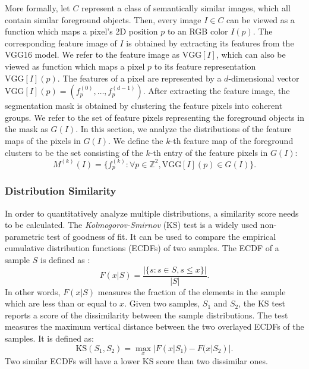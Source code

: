 More formally, let $C$ represent a class of semantically similar images, which all contain similar foreground objects. Then, every image $I \in C$ can be viewed as a function which maps a pixel's 2D position $p$ to an RGB color $I(p)$. The corresponding feature image of $I$ is obtained by extracting its features from the VGG16 model. We refer to the feature image as $\text{VGG}[I]$, which can also be viewed as function which maps a pixel $p$ to its feature representation $\text{VGG}[I](p)$. The features of a pixel are represented by a $d$-dimensional vector $\text{VGG}[I](p)=(f_p^{(0)}, \ldots, f_p^{(d-1)})$. After extracting the feature image, the segmentation mask is obtained by clustering the feature pixels into coherent groups. We refer to the set of feature pixels representing the foreground objects in the mask as $G(I)$. In this section, we analyze the distributions of the feature maps of the pixels in $G(I)$. We define the $k$-th feature map of the foreground clusters to be the set consisting of the $k$-th entry of the feature pixels in $G(I)$:
\begin{equation}
    M^{(k)}\!(I) = \{f_p^{(k)} : \forall p \in \mathbb{Z}^2, \text{VGG}[I](p) \in G(I) \}.
\end{equation}

\subsubsection{Distribution Similarity}

In order to quantitatively analyze multiple distributions, a similarity score needs to be calculated. The \emph{Kolmogorov-Smirnov} (KS) test \parencite{massey1951kolmogorov} is a widely used non-parametric test of goodness of fit. It can be used to compare the empirical cumulative distribution functions (ECDFs) of two samples. The ECDF of a sample $S$ is defined as \parencite{massey1951kolmogorov}:
\begin{equation}
    F(x | S) = \frac{|\{s: s \in S, s \le x\}|}{|S|}.
\end{equation}
In other words, $F(x | S)$ measures the fraction of the elements in the sample which are less than or equal to $x$.
Given two samples, $S_1$ and $S_2$, the KS test reports a score of the dissimilarity between the sample distributions. The test measures the maximum vertical distance between the two overlayed ECDFs of the samples. It is defined as:
\begin{equation}
    \text{KS}(S_1, S_2) = \max_x |F(x | S_1) - F(x | S_2)|.
\end{equation}
Two similar ECDFs will have a lower KS score than two dissimilar ones.

